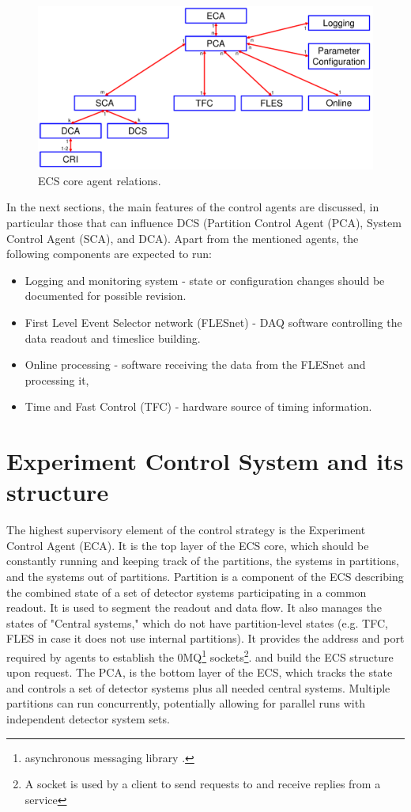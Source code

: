 \begin{figure}[!h]
\centering
\includegraphics[width=0.8\columnwidth]{Chapter3/Controls/images/AgentsRelations_V2.pdf}
\caption{\gls{ECS} core agent relations.}
\label{fig_sim}
\end{figure}

 In the next sections, the main features of the control agents are discussed, in particular those that can influence \gls{DCS} (Partition Control Agent (\gls{PCA}), System Control Agent (\gls{SCA}), and \gls{DCA}). Apart from the mentioned agents, the following components are expected to run: 
 \begin{itemize}
     \item Logging and monitoring system - state or configuration changes should be documented for possible revision.
     \item First Level Event Selector network (FLESnet) - \gls{DAQ} software controlling the data readout and timeslice building.
     \item Online processing - software receiving the data from the FLESnet and processing it,
     \item Time and Fast Control (\gls{TFC}) - hardware source of timing information.
 \end{itemize}
\section{Experiment Control System and its structure}\label{sssAgents}

The highest supervisory element of the control strategy is the Experiment Control Agent (\gls{ECA}). It is the top layer of the \gls{ECS} core, which should be constantly running and keeping track of the  partitions, the systems in partitions, and the systems out of partitions. Partition is a component of the \gls{ECS} describing the combined state of a set of detector systems participating in a common readout. It is used to segment the readout and data flow. It also manages the states of "Central systems," which do not have partition-level states (e.g. \gls{TFC}, \gls{FLES} in case it does not use internal partitions).  It provides the address and port required by agents to establish the 0MQ\footnote{asynchronous messaging library \cite{zeromq}.} sockets\footnote{A socket is used by a client to send requests to and receive replies from a service}. and build the \gls{ECS} structure upon request. The \gls{PCA}, is the bottom layer of the \gls{ECS}, which tracks the state and controls a set of detector systems plus all needed central systems. Multiple partitions can run concurrently, potentially allowing for parallel runs with independent detector system sets. 

